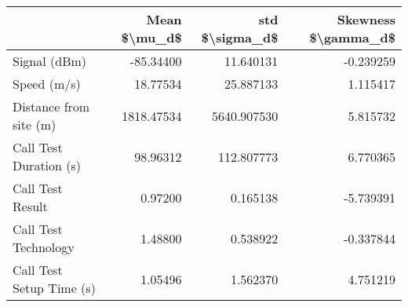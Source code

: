 \begin{tabular}{lrrr}
\toprule
{} &  Mean \$\textbackslash mu\_d\$ &  std \$\textbackslash sigma\_d\$ &  Skewness \$\textbackslash gamma\_d\$ \\
\midrule
Signal (dBm)             &     -85.34400 &       11.640131 &            -0.239259 \\
Speed (m/s)              &      18.77534 &       25.887133 &             1.115417 \\
Distance from site (m)   &    1818.47534 &     5640.907530 &             5.815732 \\
Call Test Duration (s)   &      98.96312 &      112.807773 &             6.770365 \\
Call Test Result         &       0.97200 &        0.165138 &            -5.739391 \\
Call Test Technology     &       1.48800 &        0.538922 &            -0.337844 \\
Call Test Setup Time (s) &       1.05496 &        1.562370 &             4.751219 \\
\bottomrule
\end{tabular}
